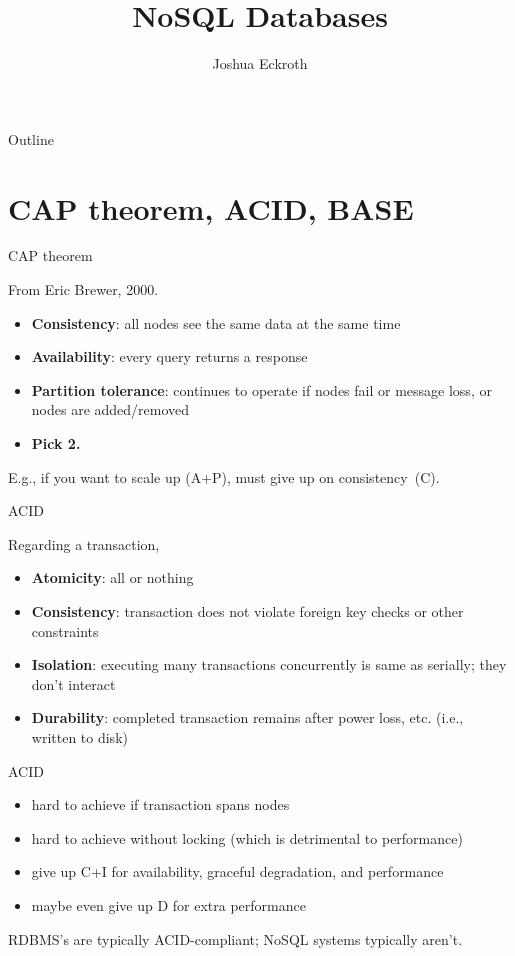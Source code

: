 \documentclass{beamer}
\title{NoSQL Databases}
\author{Joshua Eckroth}
\institute{\url{http://www.cse.ohio-state.edu/~eckroth/nosql-guide.pdf}}
\date{}
\begin{document}
\begin{frame}[plain]
  \titlepage
\end{frame}

\begin{frame}{Outline}
  \tableofcontents
\end{frame}

\section{CAP theorem, ACID, BASE}

\begin{frame}{CAP theorem}

  From Eric Brewer, 2000.

  \begin{itemize}
  \item \textbf{Consistency}: all nodes see the same data at the same
    time
  \item \textbf{Availability}: every query returns a response
  \item \textbf{Partition tolerance}: continues to operate if nodes
    fail or message loss, or nodes are added/removed
  \item \textbf{Pick 2.}
  \end{itemize}

  E.g., if you want to scale up (A+P), must give up on consistency~(C).

\end{frame}

\begin{frame}{ACID}

  Regarding a transaction,

  \begin{itemize}
  \item \textbf{Atomicity}: all or nothing
  \item \textbf{Consistency}: transaction does not violate foreign key
    checks or other constraints
  \item \textbf{Isolation}: executing many transactions concurrently
    is same as serially; they don't interact
  \item \textbf{Durability}: completed transaction remains after power
    loss, etc. (i.e., written to disk)
  \end{itemize}

\end{frame}

\begin{frame}{ACID}

  \begin{itemize}
  \item hard to achieve if transaction spans nodes
  \item hard to achieve without locking (which is detrimental to performance)
  \item give up C+I for availability, graceful degradation, and performance
  \item maybe even give up D for extra performance
  \end{itemize}

  RDBMS's are typically ACID-compliant; NoSQL systems typically aren't.

\end{frame}
\end{document}
